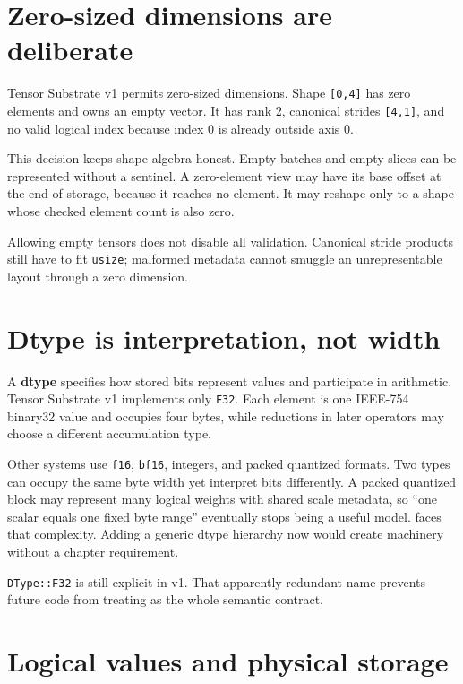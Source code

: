 \section{Zero-sized dimensions are
deliberate}\label{zero-sized-dimensions-are-deliberate}

Tensor Substrate v1 permits zero-sized dimensions. Shape
\texttt{{[}0,4{]}} has zero elements and owns an empty vector. It has
rank 2, canonical strides \texttt{{[}4,1{]}}, and no valid logical index
because index 0 is already outside axis 0.

This decision keeps shape algebra honest. Empty batches and empty slices
can be represented without a sentinel. A zero-element view may have its
base offset at the end of storage, because it reaches no element. It may
reshape only to a shape whose checked element count is also zero.

Allowing empty tensors does not disable all validation. Canonical stride
products still have to fit \texttt{usize}; malformed metadata cannot
smuggle an unrepresentable layout through a zero dimension.

\section{Dtype is interpretation, not
width}\label{dtype-is-interpretation-not-width}

A \textbf{dtype} specifies how stored bits represent values and
participate in arithmetic. Tensor Substrate v1 implements only
\texttt{F32}. Each element is one IEEE-754 binary32 value and occupies
four bytes, while reductions in later operators may choose a different
accumulation type.

Other systems use \texttt{f16}, \texttt{bf16}, integers, and packed
quantized formats. Two types can occupy the same byte width yet
interpret bits differently. A packed quantized block may represent many
logical weights with shared scale metadata, so ``one scalar equals one
fixed byte range'' eventually stops being a useful model. 
faces that complexity. Adding a generic dtype hierarchy now would
create machinery without a chapter requirement.

\texttt{DType::F32} is still explicit in v1. That apparently redundant
name prevents future code from treating
\texttt{} as the whole semantic contract.

\section{Logical values and physical
storage}\label{logical-values-and-physical-storage}


